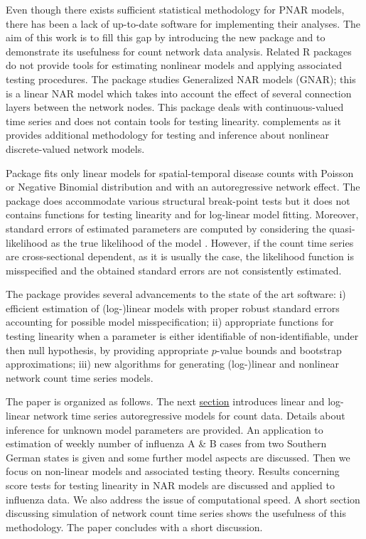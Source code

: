 Even though there exists sufficient statistical methodology for PNAR models,  there has been a lack of up-to-date software for implementing their analyses. The aim of this work is to fill this gap by introducing  the new package  \citep{armillotta_et_al_rpackage_2022} and to 
demonstrate its usefulness  for count  network data analysis. 
Related R packages    do not provide  tools  for estimating  nonlinear models and  applying associated testing procedures. The package  \citep{gnar_rpackage,Knightetal(2020)} studies Generalized NAR models (GNAR); this is a linear NAR model which takes into account  the effect of several connection layers between the network nodes. This package deals  with  continuous-valued time series and does not contain 
tools   for testing linearity.  complements  as it provides additional
methodology for testing and inference about nonlinear  discrete-valued network models. 

Package  \citep{surveillance_rpackage, Meyer_etal_2017}  fits 
only linear  models for  spatial-temporal  disease counts with Poisson or Negative Binomial distribution and with an autoregressive network effect.  The package does accommodate various structural break-point  tests but it  does not contains functions for testing linearity and for log-linear model fitting. Moreover, standard errors of estimated parameters are computed by considering the quasi-likelihood as the true likelihood of the model \cite[Sec.~2.3]{paul_etal_2008}. However, if the count time series are cross-sectional dependent, as it is usually the case,  the likelihood function  is misspecified and the obtained  standard errors are not consistently estimated.

The   package provides several advancements to the state of the  art  software: i) efficient estimation of (log-)linear models with proper robust standard errors accounting for possible model misspecification;  ii) appropriate functions for testing linearity when a parameter is either identifiable of non-identifiable, under then null hypothesis, by providing appropriate  $p$-value bounds and bootstrap approximations; iii)  new algorithms for generating (log-)linear and nonlinear network count time series models.



The paper is organized as follows. The next \hyperref[sec:Network autoregressive models]{section}
introduces linear and log-linear network time series autoregressive models for count data. Details about inference for unknown 
model parameters  are  provided. An application to estimation of weekly number of influenza A \& B cases from two Southern German states is given and some further model  aspects are discussed.
Then we focus on non-linear models and associated testing theory. 
Results concerning score tests for testing linearity in NAR models are discussed and applied to influenza  data. We also address the issue of computational speed.   A short section discussing   simulation of  network count time series shows the usefulness of this methodology.  The paper concludes with a short discussion. 


